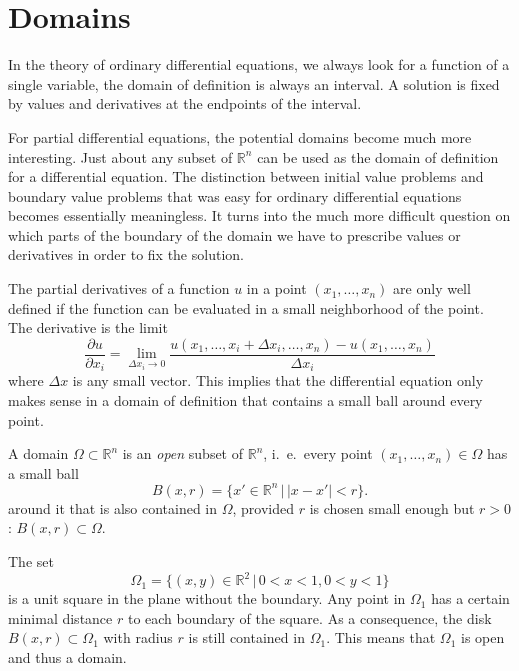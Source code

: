 %
% 
%
%
\section{Domains\label{klassifikation:gebiete}}
In the theory of ordinary differential equations, we always look for a function
of a single variable, the domain of definition is always an interval.
A solution is fixed by values and derivatives at the endpoints of the interval.

For partial differential equations, the potential domains become much
more interesting.
Just about any subset of $\mathbb R^n$ can be used as the domain of
definition for a differential equation.
The distinction between initial value problems and boundary value
problems that was easy for ordinary differential equations becomes
essentially meaningless.
It turns into the much more difficult question on which parts of
the boundary of the domain we have to prescribe values or derivatives
in order to fix the solution.

The partial derivatives of a function $u$ in a point $(x_1,\dots,x_n)$
are only well defined if the function can be evaluated in a small 
neighborhood of the point.
The derivative is the limit
\[
\frac{\partial u}{\partial x_i}=
\lim_{\Delta x_i\to 0}\frac{u(x_1,\dots,x_i+\Delta x_i, \dots ,x_n)-u(x_1,\dots,x_n)}{\Delta x_i}
\]
where $\Delta x$ is any small vector.
This implies that the differential equation only makes sense in a
domain of definition that contains a small ball around every point.

\begin{definition}
A domain
$\Omega\subset \mathbb R^n$ is an {\em open} subset of
$\mathbb R^n$, i.~e.~every point 
$(x_1,\dots,x_n)\in\Omega$
has a small ball
\[
B(x, r)=\{x'\in\mathbb R^n\,|\,|x-x'|<r\}.
\]
around it that is also contained in $\Omega$, provided $r$ is chosen
small enough but $r>0$:
$B(x,r)\subset\Omega$.
\end{definition}

\begin{beispiel}
The set
\[
\Omega_1=\{ (x,y)\in\mathbb R^2\,|\, 0 < x < 1, 0<y<1\}
\]
is a unit square in the plane without the boundary.
Any point in $\Omega_1$ has a certain minimal distance $r$ to each
boundary of the square.
As a consequence, the disk 
$B(x,r)\subset\Omega_1$ with radius $r$ is still contained in $\Omega_1$.
This means that $\Omega_1$ is open and thus a domain.
\end{beispiel}


